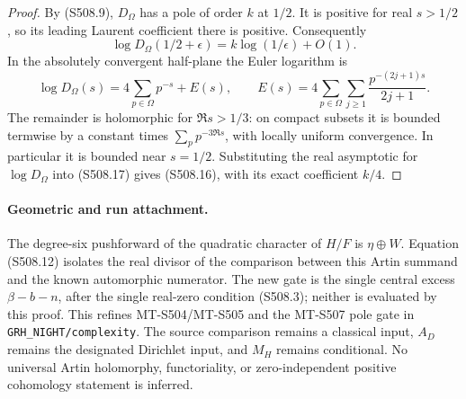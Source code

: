 \begin{proof}
By (S508.9), $D_\Omega$ has a pole of order $k$ at $1/2$.
It is positive for real $s>1/2$, so its leading Laurent
coefficient there is positive.  Consequently
\[
       \log D_\Omega(1/2+\epsilon)
             =k\log(1/\epsilon)+O(1).
\]
In the absolutely convergent half-plane the Euler logarithm is
\[
 \log D_\Omega(s)=4\sum_{p\in\Omega}p^{-s}+E(s),\qquad
 E(s)=4\sum_{p\in\Omega}\sum_{j\ge1}
              \frac{p^{-(2j+1)s}}{2j+1}.
 \tag{S508.17}
\]
The remainder is holomorphic for $\Re s>1/3$: on compact
subsets it is bounded termwise by a constant times
$\sum_p p^{-3\Re s}$, with locally uniform convergence.
In particular it is bounded near $s=1/2$.  Substituting the
real asymptotic for $\log D_\Omega$ into (S508.17) gives
(S508.16), with its exact coefficient $k/4$.
\end{proof}

\paragraph{Geometric and run attachment.}
The degree-six pushforward of the quadratic character of
$H/F$ is $\eta\oplus W$.  Equation (S508.12) isolates the
real divisor of the comparison between this Artin summand
and the known automorphic numerator.  The new gate is the
single central excess $\beta-b-n$, after the single real-zero
condition (S508.3); neither is evaluated by this proof.
This refines MT-S504/MT-S505 and the MT-S507 pole gate in
\texttt{GRH\_NIGHT/complexity}.  The source comparison remains
a classical input, $A_D$ remains the designated Dirichlet
input, and $M_H$ remains conditional.  No universal Artin
holomorphy, functoriality, or zero-independent positive
cohomology statement is inferred.


